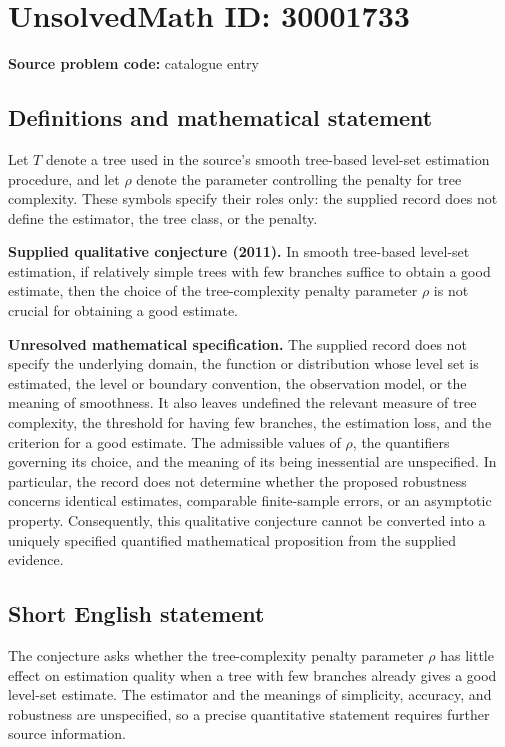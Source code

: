 \documentclass[11pt]{article}
\begin{document}
\section*{UnsolvedMath ID: 30001733}
\textbf{Source problem code:} catalogue entry
\subsection{Definitions and mathematical statement}
Let \(T\) denote a tree used in the source's smooth tree-based level-set estimation procedure, and let \(\rho\) denote the parameter controlling the penalty for tree complexity. These symbols specify their roles only: the supplied record does not define the estimator, the tree class, or the penalty.

\textbf{Supplied qualitative conjecture (2011).} In smooth tree-based level-set estimation, if relatively simple trees with few branches suffice to obtain a good estimate, then the choice of the tree-complexity penalty parameter \(\rho\) is not crucial for obtaining a good estimate.

\textbf{Unresolved mathematical specification.} The supplied record does not specify the underlying domain, the function or distribution whose level set is estimated, the level or boundary convention, the observation model, or the meaning of smoothness. It also leaves undefined the relevant measure of tree complexity, the threshold for having few branches, the estimation loss, and the criterion for a good estimate. The admissible values of \(\rho\), the quantifiers governing its choice, and the meaning of its being inessential are unspecified. In particular, the record does not determine whether the proposed robustness concerns identical estimates, comparable finite-sample errors, or an asymptotic property. Consequently, this qualitative conjecture cannot be converted into a uniquely specified quantified mathematical proposition from the supplied evidence.
\subsection{Short English statement}
The conjecture asks whether the tree-complexity penalty parameter \(\rho\) has little effect on estimation quality when a tree with few branches already gives a good level-set estimate. The estimator and the meanings of simplicity, accuracy, and robustness are unspecified, so a precise quantitative statement requires further source information.
\end{document}
